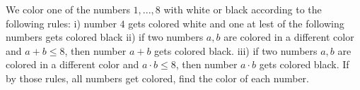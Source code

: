 We color one of the numbers $1,...,8$ with white or black according to the following rules:
i) number $4$ gets colored white and one at lest of the following numbers gets colored black
ii) if two numbers $a,b$ are colored in a different color and $a+b\le 8$, then number $a+b$ gets colored black.
iii) if two numbers $a,b$ are colored in a different color and $a\cdot b\le 8$, then number $a\cdot b$ gets colored black.
If by those rules, all numbers get colored, find the color of each number.